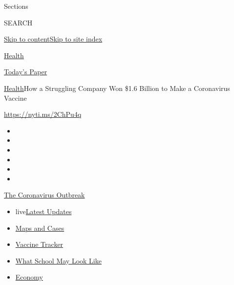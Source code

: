 Sections

SEARCH

\protect\hyperlink{site-content}{Skip to
content}\protect\hyperlink{site-index}{Skip to site index}

\href{https://www.nytimes.com/section/health}{Health}

\href{https://myaccount.nytimes.com/auth/login?response_type=cookie\&client_id=vi}{}

\href{https://www.nytimes.com/section/todayspaper}{Today's Paper}

\href{/section/health}{Health}\textbar{}How a Struggling Company Won
\$1.6 Billion to Make a Coronavirus Vaccine

\url{https://nyti.ms/2ChPu4q}

\begin{itemize}
\item
\item
\item
\item
\item
\item
\end{itemize}

\href{https://www.nytimes.com/news-event/coronavirus?action=click\&pgtype=Article\&state=default\&region=TOP_BANNER\&context=storylines_menu}{The
Coronavirus Outbreak}

\begin{itemize}
\tightlist
\item
  live\href{https://www.nytimes.com/2020/08/02/world/coronavirus-updates.html?action=click\&pgtype=Article\&state=default\&region=TOP_BANNER\&context=storylines_menu}{Latest
  Updates}
\item
  \href{https://www.nytimes.com/interactive/2020/us/coronavirus-us-cases.html?action=click\&pgtype=Article\&state=default\&region=TOP_BANNER\&context=storylines_menu}{Maps
  and Cases}
\item
  \href{https://www.nytimes.com/interactive/2020/science/coronavirus-vaccine-tracker.html?action=click\&pgtype=Article\&state=default\&region=TOP_BANNER\&context=storylines_menu}{Vaccine
  Tracker}
\item
  \href{https://www.nytimes.com/interactive/2020/07/29/us/schools-reopening-coronavirus.html?action=click\&pgtype=Article\&state=default\&region=TOP_BANNER\&context=storylines_menu}{What
  School May Look Like}
\item
  \href{https://www.nytimes.com/live/2020/07/31/business/stock-market-today-coronavirus?action=click\&pgtype=Article\&state=default\&region=TOP_BANNER\&context=storylines_menu}{Economy}
\end{itemize}

